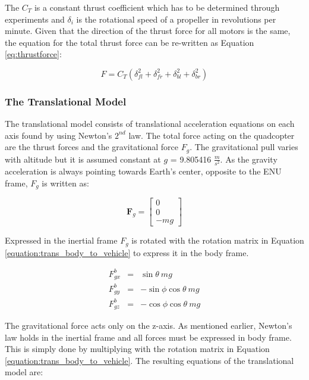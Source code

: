 The $C_T$ is a constant thrust coefficient which has to be determined through experiments and $\delta_i$ is the rotational speed of a propeller in revolutions per minute. Given that the direction of the thrust force for all motors is the same, the equation for the total thrust force can be re-written as Equation \ref{eq:thrustforce}:

\begin{equation}  \label{eq:thrustforce}
	F = C_T(\delta_{fl}^2 + \delta_{fr}^2 + \delta_{bl}^2 + \delta_{br}^2)
\end{equation}

\subsubsection{The Translational Model}

The translational model consists of translational acceleration equations on each axis found by using Newton's $2^{nd}$ law. The total force acting on the quadcopter are the thrust forces and the gravitational force $F_g$. The gravitational pull varies with altitude but it is assumed constant at $g$ = 9.805416 $\frac{m}{s^2}$. As the gravity acceleration is always pointing towards Earth's center, opposite to the ENU frame, $F_g$ is written as:

\begin{equation} \label{eq:gravForce}
	\bm{F}_{g} =
	\begin{bmatrix}
		0\\ 0 \\-mg
	\end{bmatrix}
\end{equation}

Expressed in the inertial frame $F_g$ is rotated with the rotation matrix in Equation \ref{equation:trans_body_to_vehicle} to express it in the body frame.

\begin{eqnarray}
	{F}^b_{gx} &= & \sin \theta ~m g \\
	{F}^b_{gy} &= & -\sin \phi \cos \theta ~m g \\
	{F}^b_{gz} &= & -\cos \phi \cos \theta ~m g 
\end{eqnarray}

The gravitational force acts only on the z-axis. As mentioned earlier, Newton's law holds in the inertial frame and all forces must be expressed in body frame. This is simply done by multiplying with the rotation matrix in Equation \ref{equation:trans_body_to_vehicle}. The resulting equations of the translational model are:

